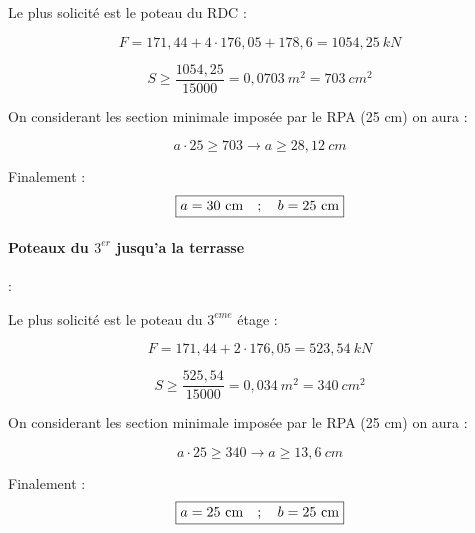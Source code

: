 \documentclass[12pt,a4paper]{article}
\begin{document}
	Le plus solicité est le poteau du RDC : 
	
	\[ F = 171,44 + 4 \cdot 176,05 + 178,6 = 1054,25~\unit{kN} \]
	
	
	
	
	
	\[ S \geq \dfrac{1054,25}{15000} = 0,0703~\unit{m^{2}} = 703~\unit{cm^{2}} \]
	
	On considerant les section minimale imposée par le RPA (25 cm) on aura :
	
	\[ a \cdot 25 \geq 703 \longrightarrow a \geq 28,12~\unit{cm} \]
	
	Finalement : \[\fbox{$ a = 30~\unit{cm} \quad ; \quad b = 25~\unit{cm} $}\]
	
	
	\vspace{5\baselineskip}
	
	
	
	\paragraph{Poteaux du $3^{er}$ jusqu'a la terrasse} :
	
	Le plus solicité est le poteau du $3^{eme}$ étage : 
	
	\[ F = 171,44 + 2 \cdot 176,05 = 523,54~\unit{kN} \]
	
	
	
	
	
	\[ S \geq \dfrac{525,54}{15000} = 0,034~\unit{m^{2}} = 340~\unit{cm^{2}} \]
	
	On considerant les section minimale imposée par le RPA (25 cm) on aura :
	
	\[ a \cdot 25 \geq 340 \longrightarrow a \geq 13,6~\unit{cm} \]
	
	Finalement : \[\fbox{$ a = 25~\unit{cm} \quad ; \quad b = 25~\unit{cm} $}\]
	
	
	
	
\end{document}
